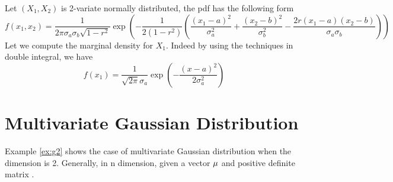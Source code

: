 \begin{example}\label{ex:g2}
	Let $(X_1, X_2)$ is 2-variate normally distributed,  the pdf has the following form
\begin{equation}
f(x_1, x_2) = \frac{1}{2\pi \sigma_a \sigma_b \sqrt{1-r^2}} \exp(-\frac{1}{2(1-r^2)} \left(\frac{(x_1-a)^2}{\sigma_a^2} + \frac{(x_2-b)^2}{\sigma_b^2} -\frac{2r(x_1-a)(x_2-b)}{\sigma_a \sigma_b}\right)) 
\end{equation}
Let we compute the marginal density for $X_1$. Indeed by using the techniques in double integral, we have
\begin{equation}
f(x_1) = \frac{1}{\sqrt{2\pi}\sigma_a} \exp(-\frac{(x-a)^2}{2\sigma_a^2})
\end{equation}

\end{example}

\section{Multivariate Gaussian Distribution}
Example \ref{ex:g2} shows the case of multivariate Gaussian distribution when the dimension is 2. Generally, in n dimension, given a vector $\b{\mu}$ and positive definite matrix $$.